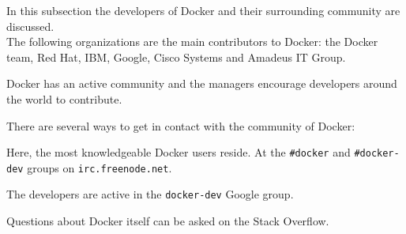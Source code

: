 
In this subsection the developers of Docker and their surrounding community are discussed. \\

The following organizations are the main contributors to Docker: the Docker team, Red Hat, IBM, Google, Cisco Systems and Amadeus IT Group. 

Docker has an active community and the managers encourage developers around the world to contribute. \cite{dockeroswrittenfor}

There are several ways to get in contact with the community of Docker:
\begin{description}[labelwidth=6cm,labelindent=30pt,style=multiline,leftmargin=5.5cm,font=\normalfont\itshape]

\item [IRC] Here, the most knowledgeable Docker users reside. At the \verb|#docker| and \verb|#docker-dev| groups on \verb|irc.freenode.net|.

\item [Google Groups] The developers are active in the \verb|docker-dev| Google group.

\item [Stack Overflow] Questions about Docker itself can be asked on the Stack Overflow. 

\end{description}

